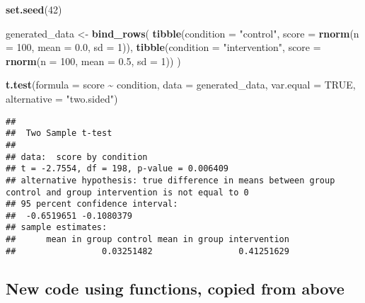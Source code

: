 \documentclass[
]{article}
\newenvironment{Shaded}{\begin{snugshade}}{\end{snugshade}}
\newcommand{\AttributeTok}[1]{\textcolor[rgb]{0.13,0.29,0.53}{#1}}
\newcommand{\ConstantTok}[1]{\textcolor[rgb]{0.56,0.35,0.01}{#1}}
\newcommand{\DecValTok}[1]{\textcolor[rgb]{0.00,0.00,0.81}{#1}}
\newcommand{\FloatTok}[1]{\textcolor[rgb]{0.00,0.00,0.81}{#1}}
\newcommand{\FunctionTok}[1]{\textcolor[rgb]{0.13,0.29,0.53}{\textbf{#1}}}
\newcommand{\NormalTok}[1]{#1}
\newcommand{\OtherTok}[1]{\textcolor[rgb]{0.56,0.35,0.01}{#1}}
\newcommand{\SpecialCharTok}[1]{\textcolor[rgb]{0.81,0.36,0.00}{\textbf{#1}}}
\newcommand{\StringTok}[1]{\textcolor[rgb]{0.31,0.60,0.02}{#1}}
\begin{document}
\begin{Shaded}
\begin{Highlighting}[]
\FunctionTok{set.seed}\NormalTok{(}\DecValTok{42}\NormalTok{)}

\NormalTok{generated\_data }\OtherTok{\textless{}{-}} 
  \FunctionTok{bind\_rows}\NormalTok{(}
    \FunctionTok{tibble}\NormalTok{(}\AttributeTok{condition =} \StringTok{"control"}\NormalTok{,}
           \AttributeTok{score =} \FunctionTok{rnorm}\NormalTok{(}\AttributeTok{n =} \DecValTok{100}\NormalTok{, }\AttributeTok{mean =} \FloatTok{0.0}\NormalTok{, }\AttributeTok{sd =} \DecValTok{1}\NormalTok{)),}
    \FunctionTok{tibble}\NormalTok{(}\AttributeTok{condition =} \StringTok{"intervention"}\NormalTok{,}
           \AttributeTok{score =} \FunctionTok{rnorm}\NormalTok{(}\AttributeTok{n =} \DecValTok{100}\NormalTok{, }\AttributeTok{mean =} \FloatTok{0.5}\NormalTok{, }\AttributeTok{sd =} \DecValTok{1}\NormalTok{))}
\NormalTok{  ) }

\FunctionTok{t.test}\NormalTok{(}\AttributeTok{formula =}\NormalTok{ score }\SpecialCharTok{\textasciitilde{}}\NormalTok{ condition, }
       \AttributeTok{data =}\NormalTok{ generated\_data,}
       \AttributeTok{var.equal =} \ConstantTok{TRUE}\NormalTok{,}
       \AttributeTok{alternative =} \StringTok{"two.sided"}\NormalTok{)}
\end{Highlighting}
\end{Shaded}

\begin{verbatim}
## 
##  Two Sample t-test
## 
## data:  score by condition
## t = -2.7554, df = 198, p-value = 0.006409
## alternative hypothesis: true difference in means between group control and group intervention is not equal to 0
## 95 percent confidence interval:
##  -0.6519651 -0.1080379
## sample estimates:
##      mean in group control mean in group intervention 
##                 0.03251482                 0.41251629
\end{verbatim}

\hypertarget{new-code-using-functions-copied-from-above}{%
\subsection{New code using functions, copied from
above}\label{new-code-using-functions-copied-from-above}}
\end{document}
